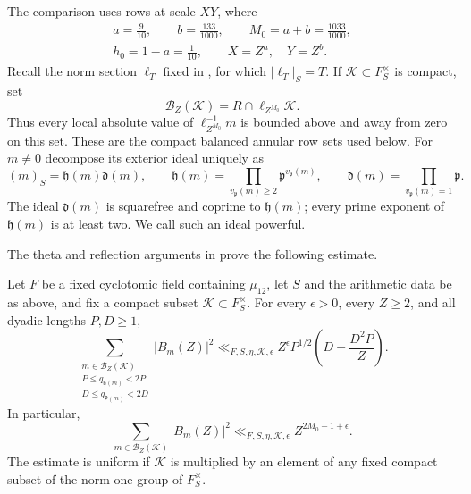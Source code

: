 The comparison uses rows at scale \(XY\), where
\begin{equation}\label{eq:reflection-scales}
\begin{gathered}
 a=\frac9{10},\qquad b=\frac{133}{1000},\qquad
 M_0=a+b=\frac{1033}{1000},\\
 h_0=1-a=\frac1{10},\qquad X=Z^a,\quad Y=Z^b.
\end{gathered}
\end{equation}
Recall the norm section \(\ell_T\) fixed in , for which
\(|\ell_T|_S=T\).  If \(\mathscr K\subset F_S^\times\) is compact, set
\[
 \mathscr B_Z(\mathscr K)=R\cap\ell_{Z^{M_0}}\mathscr K.
\]
Thus every local absolute value of \(\ell_{Z^{M_0}}^{-1}m\) is bounded
above and away from zero on this set.  These are the compact balanced
annular row sets used below.  For \(m\ne0\) decompose its exterior ideal
uniquely as
\[
 (m)_S=\mathfrak h(m)\mathfrak d(m),
 \qquad
 \mathfrak h(m)=\prod_{v_{\mathfrak p}(m)\geq2}
                    \mathfrak p^{v_{\mathfrak p}(m)},
 \qquad
 \mathfrak d(m)=\prod_{v_{\mathfrak p}(m)=1}\mathfrak p.
\]
The ideal \(\mathfrak d(m)\) is squarefree and coprime to \(\mathfrak h(m)\);
every prime exponent of \(\mathfrak h(m)\) is at least two.  We call such an
ideal powerful.

The theta and reflection arguments in 
prove the following estimate.

\begin{proposition}\label{prop:reflection}
Let \(F\) be a fixed cyclotomic field containing \(\mu_{12}\), let \(S\) and the
arithmetic data be as above, and fix a compact subset
\(\mathscr K\subset F_S^\times\).  For every \(\epsilon>0\), every \(Z\geq2\),
and all dyadic lengths \(P,D\geq1\),
\begin{equation}\label{eq:reflection-dyadic-mass}
 \sum_{\substack{m\in\mathscr B_Z(\mathscr K)\\
        P\leq q_{\mathfrak h(m)}<2P\\
        D\leq q_{\mathfrak d(m)}<2D}}
 |B_m(Z)|^2
 \ll_{F,S,\eta,\mathscr K,\epsilon}
 Z^\epsilon P^{1/2}\left(D+\frac{D^2P}{Z}\right).
\end{equation}
In particular,
\begin{equation}\label{eq:reflection-total-mass}
 \sum_{m\in\mathscr B_Z(\mathscr K)}|B_m(Z)|^2
 \ll_{F,S,\eta,\mathscr K,\epsilon} Z^{2M_0-1+\epsilon}.
\end{equation}
The estimate is uniform if \(\mathscr K\) is multiplied by an element of any
fixed compact subset of the norm-one group of \(F_S^\times\).
\end{proposition}


